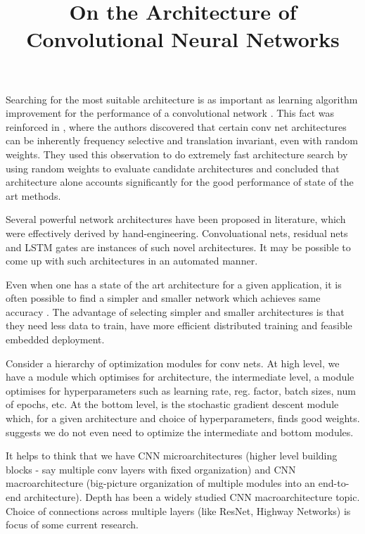 \documentclass{article}
\title{On the Architecture of Convolutional Neural Networks}
\begin{document}
\date{}

\maketitle

Searching for the most suitable architecture is as important as learning algorithm improvement for the performance of a convolutional network \cite{jarrett2009best}. This fact was reinforced in \cite{saxe2011random}, where the authors discovered that certain conv net architectures can be inherently frequency selective and translation invariant, even with random weights. They used this observation to do extremely fast architecture search by using random weights to evaluate candidate architectures and concluded that architecture alone accounts significantly for the good performance of state of the art methods.  

Several powerful network architectures have been proposed in literature, which were effectively derived by hand-engineering. Convoluational nets, residual nets and LSTM gates are instances of such novel architectures. It may be possible to come up with such architectures in an automated manner.  

Even when one has a state of the art architecture for a given application, it is often possible to find a simpler and smaller network which achieves same accuracy \cite{iandola2016squeezenet}. The advantage of selecting simpler and smaller architectures is that they need less data to train, have more efficient distributed training and feasible embedded deployment. 

Consider a hierarchy of optimization modules for conv nets. At high level, we have a module which optimises for architecture, the intermediate level, a module optimises for hyperparameters such as learning rate, reg. factor, batch sizes, num of epochs, etc. At the bottom level, is the stochastic gradient descent module which, for a given architecture and choice of hyperparameters, finds good weights. \cite{saxe2011random} suggests we do not even need to optimize the intermediate and bottom modules.

It helps to think that we have CNN microarchitectures (higher level building blocks - say multiple conv layers with fixed organization) and CNN macroarchitecture (big-picture organization of multiple modules into an end-to-end architecture). Depth has been a widely studied CNN macroarchitecture topic. Choice of connections across multiple layers (like ResNet, Highway Networks) is focus of some current research. \cite{iandola2016squeezenet}
\end{document}
